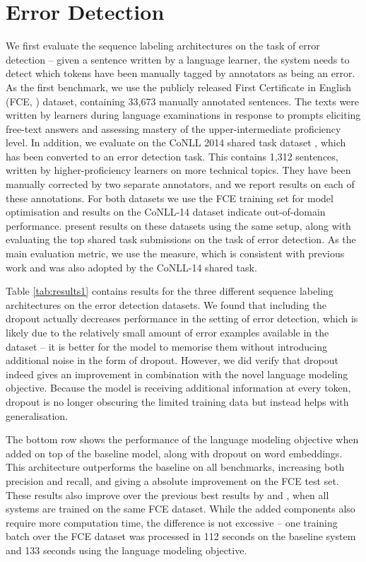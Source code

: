 \documentclass[11pt,a4paper]{article}
\begin{document}
\section{Error Detection}



We first evaluate the sequence labeling architectures on the task of error detection -- given a sentence written by a language learner, the system needs to detect which tokens have been manually tagged by annotators as being an error. 
As the first benchmark, we use the publicly released First Certificate in English (FCE, ) dataset, containing 33,673 manually annotated sentences.
The texts were written by learners during language examinations in response to prompts eliciting free-text answers and assessing mastery of the upper-intermediate proficiency level.
In addition, we evaluate on the CoNLL 2014 shared task dataset \cite{Ng2013a}, which has been converted to an error detection task. This contains 1,312 sentences, written by higher-proficiency learners on more technical topics. They have been manually corrected by two separate annotators, and we report results on each of these annotations. For both datasets we use the FCE training set for model optimisation and results on the CoNLL-14 dataset indicate out-of-domain performance.
 present results on these datasets using the same setup, along with evaluating the top shared task submissions on the task of error detection.
As the main evaluation metric, we use the  measure, which is consistent with previous work and was also adopted by the CoNLL-14 shared task.

Table \ref{tab:results1} contains results for the three different sequence labeling architectures on the error detection datasets.
We found that including the dropout actually decreases performance in the setting of error detection, which is likely due to the relatively small amount of error examples available in the dataset -- it is better for the model to memorise them without introducing additional noise in the form of dropout.
However, we did verify that dropout indeed gives an improvement in combination with the novel language modeling objective. Because the model is receiving additional information at every token, dropout is no longer obscuring the limited training data but instead helps with generalisation.

The bottom row shows the performance of the language modeling objective when added on top of the baseline model, along with dropout on word embeddings.
This architecture outperforms the baseline on all benchmarks, increasing both precision and recall, and giving a  absolute improvement on the FCE test set.
These results also improve over the previous best results by  and , when all systems are trained on the same FCE dataset.
While the added components also require more computation time, the difference is not excessive -- one training batch over the FCE dataset was processed in 112 seconds on the baseline system and 133 seconds using the language modeling objective.
\end{document}
